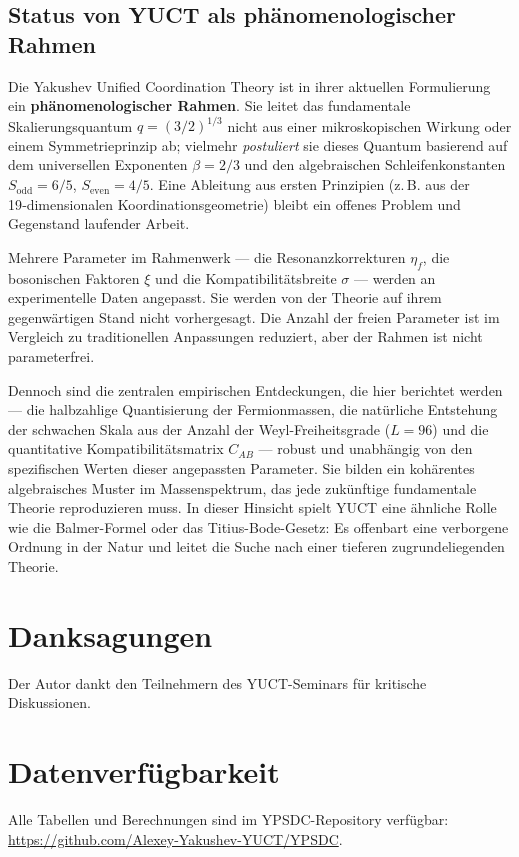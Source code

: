 \documentclass[11pt,a4paper]{article}
\begin{document}
	\subsection*{Status von YUCT als phänomenologischer Rahmen}
	
	Die Yakushev Unified Coordination Theory ist in ihrer aktuellen Formulierung ein \textbf{phänomenologischer Rahmen}. Sie leitet das fundamentale Skalierungsquantum \(q = (3/2)^{1/3}\) nicht aus einer mikroskopischen Wirkung oder einem Symmetrieprinzip ab; vielmehr \emph{postuliert} sie dieses Quantum basierend auf dem universellen Exponenten \(\beta = 2/3\) und den algebraischen Schleifenkonstanten \(S_{\mathrm{odd}}=6/5\), \(S_{\mathrm{even}}=4/5\). Eine Ableitung aus ersten Prinzipien (z. B. aus der 19‑dimensionalen Koordinationsgeometrie) bleibt ein offenes Problem und Gegenstand laufender Arbeit.
	
	Mehrere Parameter im Rahmenwerk — die Resonanzkorrekturen \(\eta_f\), die bosonischen Faktoren \(\xi\) und die Kompatibilitätsbreite \(\sigma\) — werden an experimentelle Daten angepasst. Sie werden von der Theorie auf ihrem gegenwärtigen Stand nicht vorhergesagt. Die Anzahl der freien Parameter ist im Vergleich zu traditionellen Anpassungen reduziert, aber der Rahmen ist nicht parameterfrei.
	
	Dennoch sind die zentralen empirischen Entdeckungen, die hier berichtet werden — die halbzahlige Quantisierung der Fermionmassen, die natürliche Entstehung der schwachen Skala aus der Anzahl der Weyl-Freiheitsgrade (\(L=96\)) und die quantitative Kompatibilitätsmatrix \(C_{AB}\) — robust und unabhängig von den spezifischen Werten dieser angepassten Parameter. Sie bilden ein kohärentes algebraisches Muster im Massenspektrum, das jede zukünftige fundamentale Theorie reproduzieren muss. In dieser Hinsicht spielt YUCT eine ähnliche Rolle wie die Balmer-Formel oder das Titius-Bode-Gesetz: Es offenbart eine verborgene Ordnung in der Natur und leitet die Suche nach einer tieferen zugrundeliegenden Theorie.
	
	\section*{Danksagungen}
	Der Autor dankt den Teilnehmern des YUCT-Seminars für kritische Diskussionen.
	
	\section*{Datenverfügbarkeit}
	Alle Tabellen und Berechnungen sind im YPSDC-Repository verfügbar: \url{https://github.com/Alexey-Yakushev-YUCT/YPSDC}.
	
\end{document}
